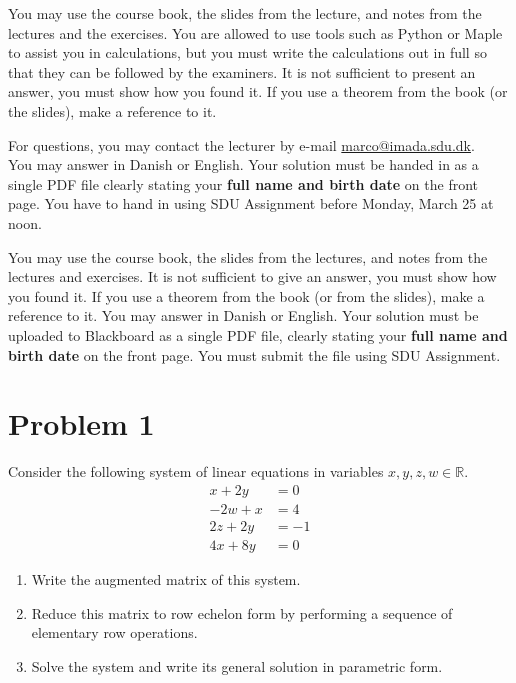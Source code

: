 \documentclass[a4paper,10pt]{article}
\def\R{\mathbb R}
\begin{document}
You may use the course book, the slides from the lecture, and notes from
the lectures and the exercises. You are allowed to use tools such as
Python or Maple to assist you in calculations, but you must write the calculations out
in full so that they can be followed by the examiners.  It is not
sufficient to present an answer, you must show how you found it.  If you
use a theorem from the book (or the slides), make a reference to
it. \newline
\vspace{5mm}

For questions, you may contact the lecturer by e-mail
\url{marco@imada.sdu.dk}. \\ You may answer in Danish or English. Your
solution must be handed in as a single PDF file clearly stating your
{\bf full name and birth date} on the front page. You have to hand in
using SDU Assignment before Monday, March 25 at noon.




You may use the course book, the slides from the lectures, and notes from the lectures and exercises. 
It is not sufficient to give an answer, you must show how you found it. If you use a theorem from the book 
(or from the slides), make a reference to it. You may answer in Danish or English. Your solution must be 
uploaded to Blackboard as a single PDF file, clearly stating your {\bf full name and birth date} on the front page. 
You must submit the file using SDU Assignment. 




\newpage
\section*{Problem 1}
Consider the following system of linear equations in variables $x,y,z,w\in \R$.
\begin{align*}
x+2y&=0 \\
-2w+x&=4 \\
2z+2y&=-1 \\
4x+8y&=0
\end{align*}
\noindent
\begin{enumerate}
\item Write the augmented matrix of this system.
\item Reduce this matrix to row echelon form by performing a sequence of elementary row
operations.
\item Solve the system and write its general solution in parametric form.
\end{enumerate}
\end{document}
